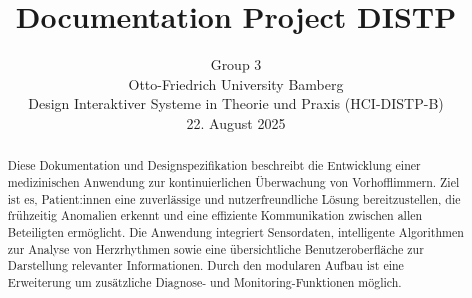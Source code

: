 \documentclass{article}
\title{Documentation Project DISTP}
\author{%
  Group 3 \\
  Otto-Friedrich University Bamberg\\
  Design Interaktiver Systeme in Theorie und Praxis (HCI-DISTP-B) \\ 
  22. August 2025 \\
}
\begin{document}
\maketitle

\begin{abstract}
Diese Dokumentation und Designspezifikation beschreibt die Entwicklung einer medizinischen Anwendung zur kontinuierlichen Überwachung von Vorhofflimmern. Ziel ist es, Patient:innen eine zuverlässige und nutzerfreundliche Lösung bereitzustellen, die frühzeitig Anomalien erkennt und eine effiziente Kommunikation zwischen allen Beteiligten ermöglicht. Die Anwendung integriert Sensordaten, intelligente Algorithmen zur Analyse von Herzrhythmen sowie eine übersichtliche Benutzeroberfläche zur Darstellung relevanter Informationen. Durch den modularen Aufbau ist eine Erweiterung um zusätzliche Diagnose- und Monitoring-Funktionen möglich.
\end{abstract}








\end{document}
